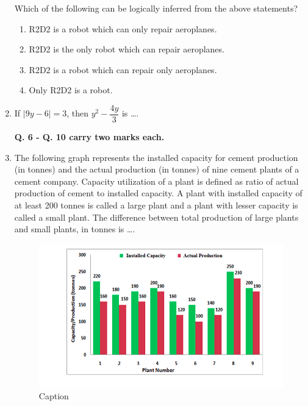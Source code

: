 \documentclass[journal,12pt,onecolumn]{IEEEtran}
\theoremstyle{remark}
\begin{document}
\begin{enumerate}
Which of the following can be logically inferred from the above statements?
    \begin{enumerate}
        \item R2D2 is a robot which can only repair aeroplanes.
        \item R2D2 is the only robot which can repair aeroplanes.
        \item R2D2 is a robot which can repair only aeroplanes.
        \item Only R2D2 is a robot.
    \end{enumerate}

\item If $|9y-6|=3$, then $y^2-\dfrac{4y}{3}$ is \dots.
    \begin{enumerate}
    \end{enumerate}

\textbf{Q. 6 - Q. 10 carry two marks each.}

\item The following graph represents the installed capacity for cement production (in tonnes) and the actual production (in tonnes) of nine cement plants of a cement company. Capacity utilization of a plant is defined as ratio of actual production of cement to installed capacity. A plant with installed capacity of at least 200 tonnes is called a large plant and a plant with lesser capacity is called a small plant. The difference between total production of large plants and small plants, in tonnes is \dots.

\begin{figure}[H]
    \centering
    \includegraphics[width=0.5\columnwidth]{figs/Screenshot from 2025-08-16 13-10-40.png}
    \caption{Caption}
    \label{fig:placeholder}
\end{figure}
   

\end{enumerate}
\end{document}
